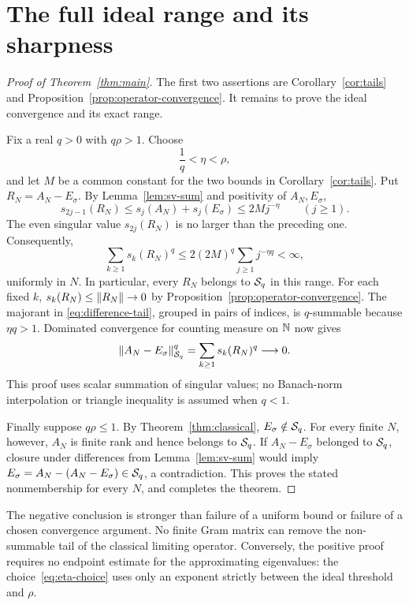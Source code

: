 \section{The full ideal range and its sharpness}
\label{sec:ideal}

\begin{proof}[Proof of Theorem~\ref{thm:main}]
The first two assertions are Corollary~\ref{cor:tails} and
Proposition~\ref{prop:operator-convergence}. It remains to prove
the ideal convergence and its exact range.

Fix a real $q>0$ with $q\rho>1$. Choose
\begin{equation}
 \frac1q<\eta<\rho,
 \label{eq:eta-choice}
\end{equation}
and let $M$ be a common constant for the two bounds in
Corollary~\ref{cor:tails}. Put $R_N=A_N-E_\sigma$. By
Lemma~\ref{lem:sv-sum} and positivity of $A_N,E_\sigma$,
\begin{equation}
 s_{2j-1}(R_N)
 \le s_j(A_N)+s_j(E_\sigma)
 \le2M j^{-\eta}
 \qquad(j\ge1).
 \label{eq:difference-tail}
\end{equation}
The even singular value $s_{2j}(R_N)$ is no larger than the preceding
one. Consequently,
\begin{equation}
 \sum_{k\ge1}s_k(R_N)^q
 \le2(2M)^q\sum_{j\ge1}j^{-\eta q}<\infty,
 \label{eq:summable-majorant}
\end{equation}
uniformly in $N$. In particular, every $R_N$ belongs to $\mathcal S_q$
in this range. For each fixed $k$,
$s_k(R_N)\le\lVert R_N\rVert\to0$ by
Proposition~\ref{prop:operator-convergence}. The majorant in
\eqref{eq:difference-tail}, grouped in pairs of indices, is
$q$-summable because $\eta q>1$. Dominated convergence for
counting measure on $\mathbb N$ now gives
\[
 \lVert A_N-E_\sigma\rVert_{\mathcal S_q}^q
 =\sum_{k\ge1}s_k(R_N)^q\longrightarrow0.
\]
This proof uses scalar summation of singular values; no Banach-norm
interpolation or triangle inequality is assumed when $q<1$.

Finally suppose $q\rho\le1$. By
Theorem~\ref{thm:classical}, $E_\sigma\notin\mathcal S_q$. For every
finite $N$, however, $A_N$ is finite rank and hence belongs to
$\mathcal S_q$. If $A_N-E_\sigma$ belonged to $\mathcal S_q$, closure under
differences from Lemma~\ref{lem:sv-sum} would imply
$E_\sigma=A_N-(A_N-E_\sigma)\in\mathcal S_q$, a contradiction.
This proves the stated nonmembership for every $N$, and completes
the theorem.
\end{proof}

The negative conclusion is stronger than failure of a uniform bound
or failure of a chosen convergence argument. No finite Gram matrix can
remove the non-summable tail of the classical limiting operator.
Conversely, the positive proof requires no endpoint estimate for
the approximating eigenvalues: the choice~\eqref{eq:eta-choice}
uses only an exponent strictly between the ideal threshold and
$\rho$.
